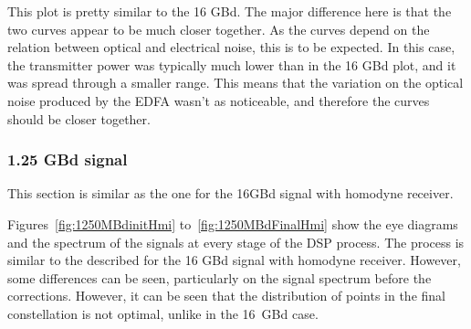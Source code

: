 	This plot is pretty similar to the 16 GBd. The major difference here is that
	the two curves appear to be much closer together. As the curves depend on the
	relation between optical and electrical noise, this is to be expected. In this
	case, the transmitter power was typically much lower than in the 16 GBd plot,
	and it was spread through a smaller range. This means that the variation on
	the optical noise produced by the EDFA wasn't as noticeable, and therefore the
	curves should be closer together.

	\subsubsection{1.25 GBd signal}

	This section is similar as the one for the 16GBd signal with homodyne receiver.

	Figures~\ref{fig:1250MBdinitHmi} to~\ref{fig:1250MBdFinalHmi} show the eye diagrams and the spectrum of the signals at every stage of the DSP process. The process is similar to the described for the 16 GBd signal with homodyne receiver. However, some differences can be seen, particularly on the signal spectrum before the corrections. However, it can be seen that the distribution of points in the final constellation is not optimal, unlike in the 16~GBd case.

